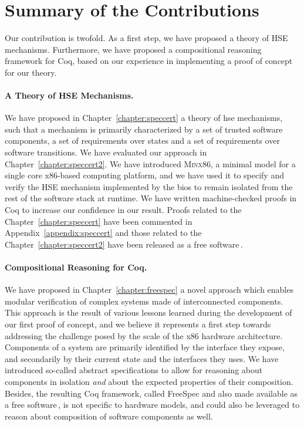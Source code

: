 \section{Summary of the Contributions}
\label{sec:conclusion:summary}

Our contribution is twofold.
%
As a first step, we have proposed a theory of HSE mechanisms.
%
Furthermore, we have proposed a compositional reasoning framework for Coq, based
on our experience in implementing a proof of concept for our theory.

\paragraph{A Theory of HSE Mechanisms.}
%
We have proposed in Chapter~\ref{chapter:speccert} a theory of \ac{hse}
mechanisms, such that a mechanism is primarily characterized by a set of trusted
software components, a set of requirements over states and a set of requirements
over software transitions.
%
We have evaluated our approach in Chapter~\ref{chapter:speccert2}.
%
We have introduced {\scshape Minx86}, a minimal model for a single core
x86-based computing platform, and we have used it to specify and verify the HSE
mechanism implemented by the \ac{bios} to remain isolated from the rest of the
software stack at runtime.
%
We have written machine-checked proofs in Coq to increase our confidence in our
result.
%
Proofs related to the Chapter~\ref{chapter:speccert} have been
commented in Appendix~\ref{appendix:speccert} and those related to the Chapter~\ref{chapter:speccert2} have been released as a free software\,\cite{letan2016speccertcode}.

\paragraph{Compositional Reasoning for Coq.}
%
We have proposed in Chapter~\ref{chapter:freespec} a novel approach which
enables modular verification of complex systems made of interconnected
components.
%
This approach is the result of various lessons learned during the development of
our first proof of concept, and we believe it represents a first step towards
addressing the challenge posed by the scale of the x86 hardware architecture.
%
Components of a system are primarily identified by the interface they expose,
and secondarily by their current state and the interfaces they uses.
%
We have introduced so-called abstract specifications to allow for reasoning
about components in isolation \emph{and} about the expected properties of their
composition.
%
Besides, the resulting Coq framework, called FreeSpec and also made available as
a free software\,\cite{letan2018freespeccode}, is not specific to hardware
models, and could also be leveraged to reason about composition of software
components as well.

